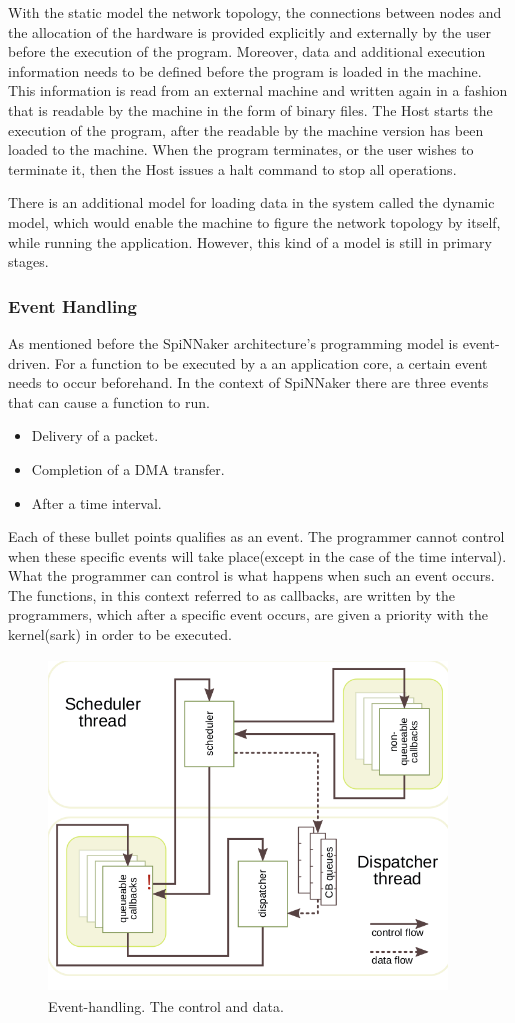 \documentclass[12pt,twosided]{article}
\begin{document}
With the static model the network topology, the connections between nodes and the allocation of the hardware is provided explicitly and externally by the user before the execution of the program. Moreover, data and additional execution information needs to be defined before the program is loaded in the machine. This information is read from an external machine and written again in a fashion that is readable by the machine in the form of binary files. The Host starts the execution of the program, after the readable by the machine version has been loaded to the machine. When the program terminates, or the user wishes to terminate it, then the Host issues a halt command to stop all operations\cite{docfile}.

There is an additional model for loading data in the system called the dynamic model, which would enable the machine to figure the network topology by itself, while running the application. However, this kind of a model is still in primary stages\cite{docfile}.
\subsubsection{Event Handling}
As mentioned before the SpiNNaker architecture's programming model is event-driven. For a function to be executed by a an application core, a certain event needs to occur beforehand. In the context of SpiNNaker there are three events that can cause a function to run.
\begin{itemize}
\item Delivery of a packet.
\item Completion of a DMA transfer.
\item After a time interval.
\end{itemize}
Each of these bullet points qualifies as an event. The programmer cannot control when these specific events will take place(except in the case of the time interval). What the programmer can control is what happens when such an event occurs. The functions, in this context referred to as callbacks, are written by the programmers, which after a specific event occurs, are given a priority with the kernel(sark) in order to be executed. 
\begin{figure}[h!]
\includegraphics[width=300pt,height=250pt,scale=2]{Pics/event-handling.png}
\centering
\caption{Event-handling. The control and data\cite{sharp2011event}.}
\end{figure}
\end{document}
